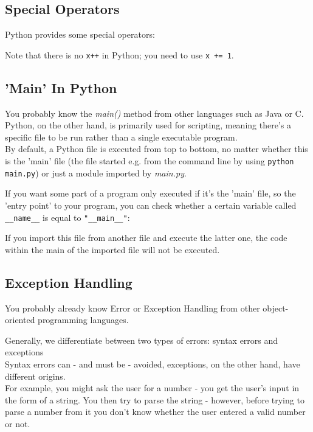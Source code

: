     \subsection{Special Operators}
        Python provides some special operators:


        Note that there is no \texttt{x++} in Python; you need to use
        \texttt{x += 1}.

    \subsection{'Main' In Python}
        You probably know the \textit{main()} method from other languages such as Java or C. \\
        Python, on the other hand, is primarily used for scripting, meaning there's a specific file
        to be run rather than a single executable program. \\
        By default, a Python file is executed from top to bottom, no matter whether this is the
        'main' file (the file started e.g. from the command line by using
        \texttt{python main.py}) or just a module imported by \textit{main.py}.

        If you want some part of a program only executed if it's the 'main' file, so the
        'entry point' to your program, you can check whether a certain variable called
        \texttt{__name__} is equal to \texttt{"__main__"}:


        If you import this file from another file and execute the latter one, the code within the
        main of the imported file will not be executed.


    \subsection{Exception Handling}
        You probably already know Error or Exception Handling from other object-oriented
        programming languages.

        Generally, we differentiate between two types of errors: syntax errors and exceptions \\
        Syntax errors can - and must be - avoided, exceptions, on the other hand, have different
        origins. \\
        For example, you might ask the user for a number - you get the user's input in the form
        of a string. You then try to parse the string - however, before trying to parse a number
        from it you don't know whether the user entered a valid number or not.

